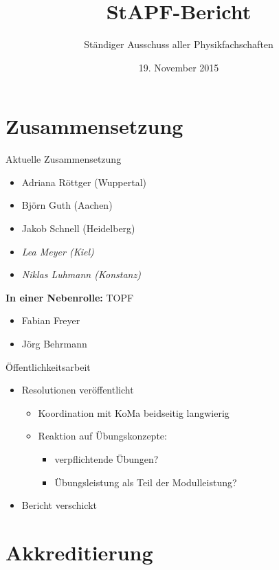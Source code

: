 \documentclass[compress,]{beamer}
\title[StAPf-Bericht]{StAPF-Bericht}
\author{Ständiger Ausschuss aller Physikfachschaften}
\institute[Zusammenkunft aller Physikfachschaften]
\date{19. November 2015}
\begin{document}
\begin{frame}
  \titlepage

\end{frame}

\section{Zusammensetzung}

\begin{frame}{Aktuelle Zusammensetzung}
	\begin{itemize}
		\item Adriana Röttger (Wuppertal)
		\item Björn Guth (Aachen)
		\item Jakob Schnell (Heidelberg)
		\item \emph{Lea Meyer (Kiel)}
		\item \emph{Niklas Luhmann (Konstanz)}
	\end{itemize}
	\textbf{In einer Nebenrolle:} TOPF
	\begin{itemize}
		\item Fabian Freyer
		\item Jörg Behrmann
	\end{itemize}
\end{frame}

\begin{frame}{Öffentlichkeitsarbeit}
	\begin{itemize}
		\item Resolutionen veröffentlicht
			\begin{itemize}
				\item Koordination mit KoMa beidseitig langwierig
				\item Reaktion auf Übungskonzepte:
					\begin{itemize}
						\item verpflichtende Übungen?
						\item Übungsleistung als Teil der Modulleistung?
					\end{itemize}
			\end{itemize}
		\item Bericht verschickt
	\end{itemize}
\end{frame}

\section{Akkreditierung}
\end{document}
